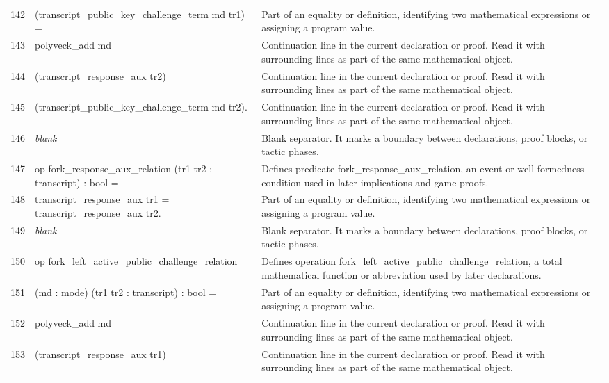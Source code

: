 \documentclass[10pt]{article}
\begin{document}
\begin{longtable}{r L{0.53\textwidth} L{0.37\textwidth}}
142 & {\ttfamily\scriptsize     (transcript\_public\_key\_challenge\_term md tr1) =} & Part of an equality or definition, identifying two mathematical expressions or assigning a program value. \\
143 & {\ttfamily\scriptsize   polyveck\_add md} & Continuation line in the current declaration or proof.  Read it with surrounding lines as part of the same mathematical object. \\
144 & {\ttfamily\scriptsize     (transcript\_response\_aux tr2)} & Continuation line in the current declaration or proof.  Read it with surrounding lines as part of the same mathematical object. \\
145 & {\ttfamily\scriptsize     (transcript\_public\_key\_challenge\_term md tr2).} & Continuation line in the current declaration or proof.  Read it with surrounding lines as part of the same mathematical object. \\
146 & {\ttfamily\scriptsize \emph{blank}} & Blank separator.  It marks a boundary between declarations, proof blocks, or tactic phases. \\
147 & {\ttfamily\scriptsize op fork\_response\_aux\_relation (tr1 tr2 : transcript) : bool =} & Defines predicate fork\_response\_aux\_relation, an event or well-formedness condition used in later implications and game proofs. \\
148 & {\ttfamily\scriptsize   transcript\_response\_aux tr1 = transcript\_response\_aux tr2.} & Part of an equality or definition, identifying two mathematical expressions or assigning a program value. \\
149 & {\ttfamily\scriptsize \emph{blank}} & Blank separator.  It marks a boundary between declarations, proof blocks, or tactic phases. \\
150 & {\ttfamily\scriptsize op fork\_left\_active\_public\_challenge\_relation} & Defines operation fork\_left\_active\_public\_challenge\_relation, a total mathematical function or abbreviation used by later declarations. \\
151 & {\ttfamily\scriptsize    (md : mode) (tr1 tr2 : transcript) : bool =} & Part of an equality or definition, identifying two mathematical expressions or assigning a program value. \\
152 & {\ttfamily\scriptsize   polyveck\_add md} & Continuation line in the current declaration or proof.  Read it with surrounding lines as part of the same mathematical object. \\
153 & {\ttfamily\scriptsize     (transcript\_response\_aux tr1)} & Continuation line in the current declaration or proof.  Read it with surrounding lines as part of the same mathematical object. \\

\end{longtable}
\end{document}

